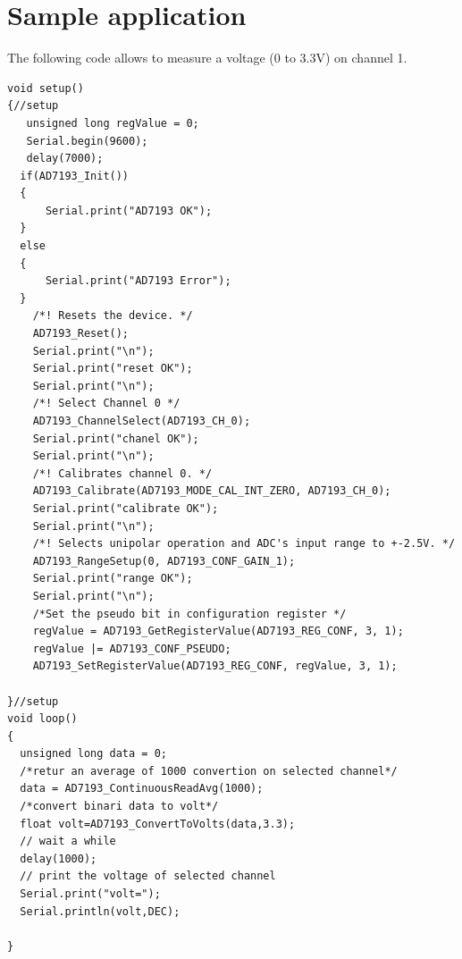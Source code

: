\documentclass[10pt,a4paper]{report}
\begin{document}
\section{Sample application}

The following code allows to measure a voltage (0 to 3.3V) on channel 1.

\begin{lstlisting}
void setup()
{//setup
   unsigned long regValue = 0;
   Serial.begin(9600);
   delay(7000);
  if(AD7193_Init())
  {
      Serial.print("AD7193 OK");
  }
  else
  {
      Serial.print("AD7193 Error");
  }
    /*! Resets the device. */
    AD7193_Reset();
    Serial.print("\n");
    Serial.print("reset OK");
    Serial.print("\n");
    /*! Select Channel 0 */
    AD7193_ChannelSelect(AD7193_CH_0);
    Serial.print("chanel OK");
    Serial.print("\n");
    /*! Calibrates channel 0. */
    AD7193_Calibrate(AD7193_MODE_CAL_INT_ZERO, AD7193_CH_0);
    Serial.print("calibrate OK");
    Serial.print("\n");
    /*! Selects unipolar operation and ADC's input range to +-2.5V. */
    AD7193_RangeSetup(0, AD7193_CONF_GAIN_1);
    Serial.print("range OK");
    Serial.print("\n");
    /*Set the pseudo bit in configuration register */
    regValue = AD7193_GetRegisterValue(AD7193_REG_CONF, 3, 1);
    regValue |= AD7193_CONF_PSEUDO;
    AD7193_SetRegisterValue(AD7193_REG_CONF, regValue, 3, 1);
    
}//setup
void loop()
{ 
  unsigned long data = 0;
  /*retur an average of 1000 convertion on selected channel*/
  data = AD7193_ContinuousReadAvg(1000);
  /*convert binari data to volt*/
  float volt=AD7193_ConvertToVolts(data,3.3);
  // wait a while
  delay(1000);
  // print the voltage of selected channel
  Serial.print("volt=");
  Serial.println(volt,DEC);

}
\end{lstlisting}
\end{document}
